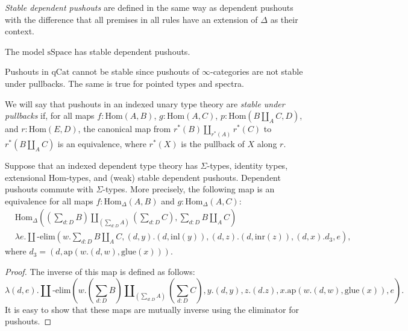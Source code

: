\documentclass[reqno]{mscs}
\newcommand{\fs}[1]{\mathrm{#1}}
\newcommand{\Hom}{\fs{Hom}}
\newcommand{\pmap}{\fs{ap}}
\newcommand{\qCat}{\fs{qCat}}
\newcommand{\sSpace}{\fs{sSpace}}
\numberwithin{figure}{section}
\begin{document}
\emph{Stable dependent pushouts} are defined in the same way as dependent pushouts with the difference that all premises in all rules have an extension of $\Delta$ as their context.

\begin{example}
The model $\sSpace$ has stable dependent pushouts.
\end{example}

\begin{example}
Pushouts in $\qCat$ cannot be stable since pushouts of $\infty$-categories are not stable under pullbacks.
The same is true for pointed types and spectra.
\end{example}

We will say that pushouts in an indexed unary type theory are \emph{stable under pullbacks} if, for all maps $f : \Hom(A,B)$, $g : \Hom(A,C)$, $p : \Hom(B \amalg_A C, D)$, and $r : \Hom(E,D)$,
the canonical map from $r^*(B) \amalg_{r^*(A)} r^*(C)$ to $r^*(B \amalg_A C)$ is an equivalence, where $r^*(X)$ is the pullback of $X$ along $r$.

\begin{prop}
Suppose that an indexed dependent type theory has $\Sigma$-types, identity types, extensional $\Hom$-types, and (weak) stable dependent pushouts.
Dependent pushouts commute with $\Sigma$-types.
More precisely, the following map is an equivalence for all maps $f : \Hom_\Delta(A,B)$ and $g : \Hom_\Delta(A,C)$:
\begin{align*}
& \Hom_\Delta((\sum_{d : D} B) \amalg_{(\sum_{d : D} A)} (\sum_{d : D} C), \sum_{d : D} B \amalg_A C) \\
& \lambda e. \amalg\text{-}\fs{elim}(w. \sum_{d : D} B \amalg_A C, (d,y).(d,\fs{inl}(y)), (d,z).(d,\fs{inr}(z)), (d,x).d_3, e),
\end{align*}
where $d_3 = (d,\pmap(w.(d,w),\fs{glue}(x)))$.
\end{prop}
\begin{proof}
The inverse of this map is defined as follows:
\[ \lambda (d,e). \amalg\text{-}\fs{elim}(w. (\sum_{d : D} B) \amalg_{(\sum_{d : D} A)} (\sum_{d : D} C), y.(d,y), z.(d.z), x.\pmap(w.(d,w),\fs{glue}(x)), e). \]
It is easy to show that these maps are mutually inverse using the eliminator for pushouts.
\end{proof}
\end{document}
